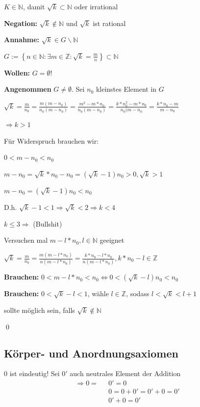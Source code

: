 \documentclass[fleqn]{scrartcl}
\renewenvironment{proof}{{\bfseries Beweis }}{\qed}
\newenvironment{example}{{\bfseries Beispiel }}{}
\begin{document}
$K \in \mathbb{N}$, damit $\sqrt{k} \subset \mathbb{N}$ oder irrational

\begin{proof}

\textbf{Negation:} $\sqrt{k} \notin \mathbb{N}$ und $\sqrt{k}$ ist rational

\textbf{Annahme:} $\sqrt{k} \in G \backslash \mathbb{N}$

$G:=\left\{ n \in \mathbb{N}: \exists m \in \mathbb{Z}: \sqrt{k} = \frac{m}{n} \right\} \subset \mathbb{N}$

\textbf{Wollen:} $G = \emptyset$!

\textbf{Angenommen} $G \neq \emptyset$. Sei $n_0$ kleinstes Element in $G$

$\sqrt{k} = \frac{m}{n_0} = \frac{m(m-n_0)}{n_0(m-n_0)} = \frac{m^2-m*n_0}{n_0(m-n_0)} = \frac{k*n_0^2-m*n_0}{n_0(m-n_0} = \frac{k*n_0-m}{m-n_0}$ 

$\Longrightarrow k>1$

Für Widerspruch brauchen wir:

$0<m-n_0<n_0$

$m-n_0 = \sqrt{k}*n_0-n_0=(\sqrt{k}-1)n_0>0,\sqrt{k}>1$ 

$m-n_0 = (\sqrt{k}-1)n_0 < n_0$

D.h. $\sqrt{k} -1<1 \Longrightarrow \sqrt{k}<2 \Longrightarrow k<4$

$k \leq 3 \Longrightarrow $ (Bullshit)

Versuchen mal $m-l*n_0,l \in \mathbb{N}$ geeignet

$\sqrt{k} = \frac{m}{n_0} = \frac{m(m-l*n_0)}{n(m-l*n_0)} = \frac{k*n_0-l*n_0}{n(m-l*n_0)}, k*n_0-l \in \mathbb{Z}$

\textbf{Brauchen:}  $0<m-l*n_0<n_0 \Longleftrightarrow 0<(\sqrt{k}-l)n_0<n_0$ 

\textbf{Brauchen:}  $0<\sqrt{k}-l<1$, wähle $l \in \mathbb{Z}$, sodass $l < \sqrt{k}<l+1$

sollte möglich sein, falls $\sqrt{k} \notin \mathbb{N}$ 

\end{proof}

\subsection{Körper- und Anordnungsaxiomen}

\begin{example}

$0$ ist eindeutig!
Sei $0'$ auch neutrales Element der Addition
\begin{align*}
  \Longrightarrow 0 = \text{ }& 0' = 0\\
                      & 0  = 0+0'=0'+0=0'\\
                      & 0' + 0=0'
\end{align*}


\end{example}
\end{document}
